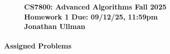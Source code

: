 \documentclass[11pt]{article}
\theoremstyle{definition}
\newcommand{\HWtitle}[2]{\begin{figure}[t!]{\bfseries \Large \color{DarkBlue}  \noindent CS7800: Advanced Algorithms \hfill Fall 2025} \\[0.2em] {\bfseries \Large \color{DarkBlue} Homework #1 \hfill Due: {#2}} \\[1em] {\bfseries \large Jonathan Ullman}\\[1ex] \end{figure}}
\begin{document}

\HWtitle{1}{09/12/25, 11:59pm}


\renewcommand{\labelenumii}{{\bfseries \em \arabic{enumi}.\arabic{enumii}}}
\newcommand{\problemitem}{\renewcommand{\labelenumi}{{\bfseries \em Problem \arabic{enumi}}}\item}
\newcommand{\solutionitem}{\renewcommand{\labelenumi}{{\bfseries \em Solution \arabic{enumi}}}\addtocounter{enumi}{-1}\item}

%

\paragraph{Assigned Problems}
\end{document}
